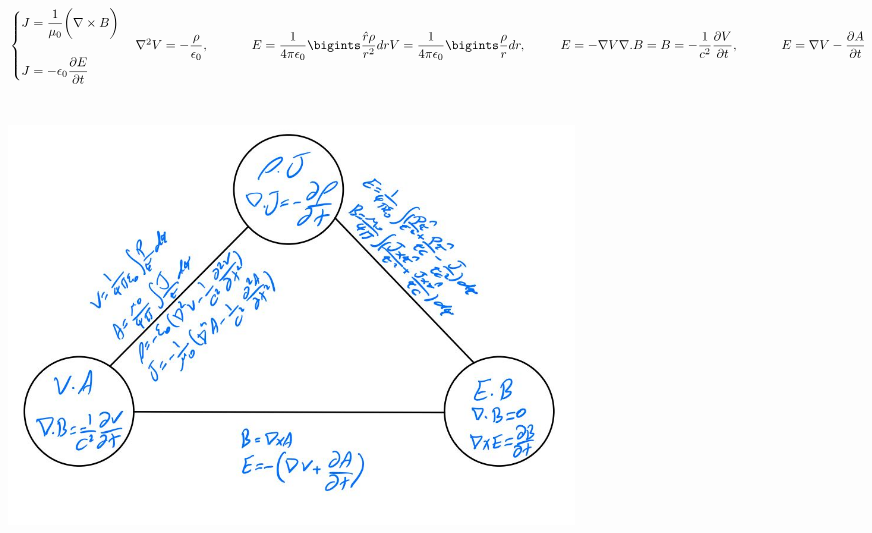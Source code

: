 \documentclass[fleqn]{article}
\begin{document}
\begin{enumerate}
        \textcolor{hwColor}{
          \\
          $
            \begin{cases}
              J=\dfrac{1}{\mu_0} \bigg( \nabla \times B \bigg)
              \\
              \\
              J=-\epsilon_0 \dfrac{\partial E}{\partial t}
            \end{cases}
            \\
            \\
            \\
            \nabla^2 V=-\dfrac{\rho}{\epsilon_0}, ~~~~~~~~~~ E=\dfrac{1}{4 \pi \epsilon_0} \bigints \dfrac{\hat{r} \rho}{r^2} dr
            \\
            \\
            V=\dfrac{1}{4 \pi \epsilon_0} \bigints \dfrac{\rho}{r} dr, ~~~~~~~~ E=-\nabla V
            \\
            \\
            \\
            \nabla.B=B=-\dfrac{1}{c^2} \dfrac{\partial V}{\partial t}, ~~~~~~~~~~ E=\nabla V-\dfrac{\partial A}{\partial t}
          $
        }

      \pagebreak

      \begin{center}
        \includegraphics[height=12cm, width=15cm]{4.JPG}
      \end{center}
    
  \end{enumerate}
\end{document}
